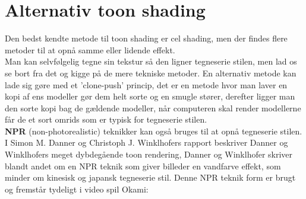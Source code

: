 \newpage
\section{Alternativ toon shading}
Den bedst kendte metode til toon shading er cel shading, men der findes flere metoder til at opnå samme eller lidende effekt.\\
Man kan selvfølgelig tegne sin tekstur så den ligner tegneserie stilen, men lad os se bort fra det og kigge på de mere tekniske metoder. En alternativ metode kan lade sig gøre med et ’clone-push’ princip,\cite{clone-push} det er en metode hvor man laver en kopi af ens modeller gør dem helt sorte og en smugle stører, derefter ligger man den sorte kopi bag de gældende modeller, når computeren skal render modellerne får de et sort omrids som er typisk for tegneserie stilen.\\

\textbf{NPR} (non-photorealistic) teknikker kan også bruges til at opnå tegneserie stilen. I Simon M. Danner og Christoph J. Winklhofers rapport\cite{npr} beskriver Danner og Winklhofers meget dybdegående toon rendering, Danner og Winklhofer skriver blandt andet om en NPR teknik som giver billeder en vandfarve effekt, som minder om kinesisk og japansk tegneserie stil. Denne NPR teknik form er brugt og fremstår tydeligt i video spil Okami:
